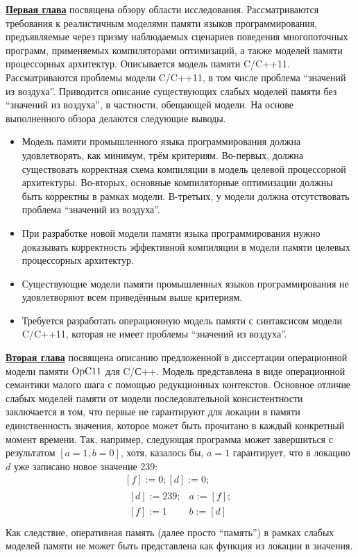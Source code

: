 \underline{\textbf{Первая глава}} посвящена обзору области исследования.
Рассматриваются требования к реалистичным моделями памяти
языков программирования, предъявляемые через призму наблюдаемых сценариев поведения многопоточных программ,
применяемых компиляторами оптимизаций, а также моделей памяти процессорных архитектур.
Описывается модель памяти C/C++11. Рассматриваются проблемы модели C/C++11, в том числе
проблема ``значений из воздуха''. Приводится описание существующих слабых моделей памяти без ``значений из воздуха'', в частности, обещающей модели.
На основе выполненного обзора делаются следующие выводы.
\begin{itemize}
  \item Модель памяти промышленного языка программирования должна удовлетворять, как минимум, трём критериям.
    Во-первых, должна существовать корректная схема компиляции в модель целевой процессорной
    архитектуры.
    Во-вторых, основные компиляторные оптимизации должны быть корректны в рамках модели.
    В-третьих, у модели должна отсутствовать проблема ``значений из воздуха''.
  \item При разработке новой модели памяти языка программирования нужно доказывать корректность эффективной компиляции
     в модели памяти целевых процессорных архитектур.
  \item Существующие модели памяти промышленных языков программирования не удовлетворяют всем приведённым выше
    критериям.
  \item Требуется разработать операционную модель памяти с синтаксисом модели C/C++11, которая
    не имеет проблемы ``значений из воздуха''.
\end{itemize}

\underline{\textbf{Вторая глава}} посвящена описанию предложенной в диссертации операционной  модели памяти $\mathrm{OpC11}$ для C/С++. Модель представлена в виде операционной семантики малого шага с помощью редукционных
контекстов. 
Основное отличие слабых моделей памяти от модели последовательной консистентности заключается в том, что
первые не гарантируют для локации в памяти единственность значения, которое может быть прочитано
в каждый конкретный момент времени.
Так, например, следующая программа может завершиться с
результатом $[a = 1, b = 0]$, хотя, казалось бы, $a = 1$ гарантирует, что
в локацию $d$ уже записано новое значение $239$:
\[
\begin{array}{c}
[f] := 0; [d] := 0; \\
\begin{array}{l||l}
  {} [d] := 239; & a := [f]; \\
  {} [f] := 1   & b := [d] \\
\end{array}
\end{array}
\]
Как следствие, оперативная память (далее просто ``память'') в рамках слабых моделей памяти не может быть представлена как функция из локации в значения.

